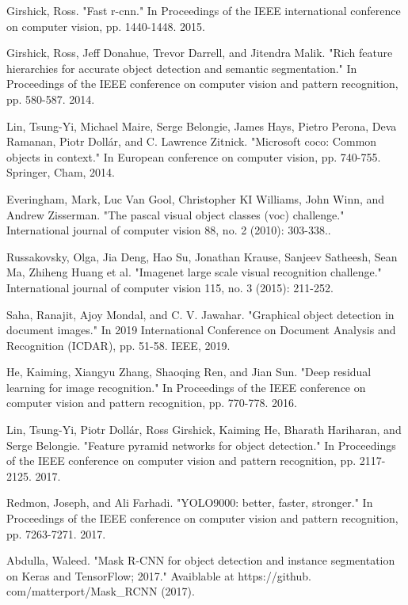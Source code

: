 \documentclass{ieeeaccess}
\begin{document}
\begin{thebibliography}{00}
 Girshick, Ross. "Fast r-cnn." In Proceedings of the IEEE international conference on computer vision, pp. 1440-1448. 2015.

 Girshick, Ross, Jeff Donahue, Trevor Darrell, and Jitendra Malik. "Rich feature hierarchies for accurate object detection and semantic segmentation." In Proceedings of the IEEE conference on computer vision and pattern recognition, pp. 580-587. 2014.

 Lin, Tsung-Yi, Michael Maire, Serge Belongie, James Hays, Pietro Perona, Deva Ramanan, Piotr Dollár, and C. Lawrence Zitnick. "Microsoft coco: Common objects in context." In European conference on computer vision, pp. 740-755. Springer, Cham, 2014.

 Everingham, Mark, Luc Van Gool, Christopher KI Williams, John Winn, and Andrew Zisserman. "The pascal visual object classes (voc) challenge." International journal of computer vision 88, no. 2 (2010): 303-338..

 Russakovsky, Olga, Jia Deng, Hao Su, Jonathan Krause, Sanjeev Satheesh, Sean Ma, Zhiheng Huang et al. "Imagenet large scale visual recognition challenge." International journal of computer vision 115, no. 3 (2015): 211-252.


 Saha, Ranajit, Ajoy Mondal, and C. V. Jawahar. "Graphical object detection in document images." In 2019 International Conference on Document Analysis and Recognition (ICDAR), pp. 51-58. IEEE, 2019.

 He, Kaiming, Xiangyu Zhang, Shaoqing Ren, and Jian Sun. "Deep residual learning for image recognition." In Proceedings of the IEEE conference on computer vision and pattern recognition, pp. 770-778. 2016.

 Lin, Tsung-Yi, Piotr Dollár, Ross Girshick, Kaiming He, Bharath Hariharan, and Serge Belongie. "Feature pyramid networks for object detection." In Proceedings of the IEEE conference on computer vision and pattern recognition, pp. 2117-2125. 2017.

 Redmon, Joseph, and Ali Farhadi. "YOLO9000: better, faster, stronger." In Proceedings of the IEEE conference on computer vision and pattern recognition, pp. 7263-7271. 2017.

 Abdulla, Waleed. "Mask R-CNN for object detection and instance segmentation on Keras and TensorFlow; 2017." Avaiblable at https://github. com/matterport/Mask\_RCNN (2017).


\end{thebibliography}
\end{document}
